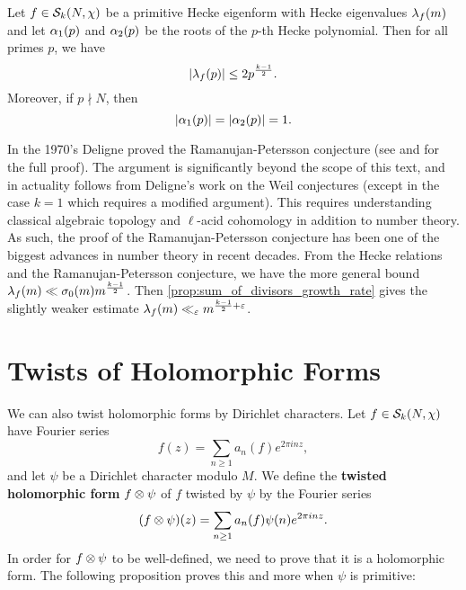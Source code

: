     \begin{theorem}
      Let $f \in \mathcal{S}_{k}(N,\chi)$ be a primitive Hecke eigenform with Hecke eigenvalues $\lambda_{f}(m)$ and let $\alpha_{1}(p)$ and $\alpha_{2}(p)$ be the roots of the $p$-th Hecke polynomial. Then for all primes $p$, we have
      \[
        |\lambda_{f}(p)| \le 2p^{\frac{k-1}{2}}.
      \]
      Moreover, if $p \nmid N$, then
      \[
        |\alpha_{1}(p)| = |\alpha_{2}(p)| = 1.
      \]
    \end{theorem}

    In the 1970's Deligne proved the Ramanujan-Petersson conjecture (see \cite{deligne1971formes} and \cite{deligne1974conjecture} for the full proof). The argument is significantly beyond the scope of this text, and in actuality follows from Deligne's work on the Weil conjectures (except in the case $k = 1$ which requires a modified argument). This requires understanding classical algebraic topology and $\ell$-acid cohomology in addition to number theory. As such, the proof of the Ramanujan-Petersson conjecture has been one of the biggest advances in number theory in recent decades. From the Hecke relations and the Ramanujan-Petersson conjecture, we have the more general bound $\lambda_{f}(m) \ll \sigma_{0}(m)m^{\frac{k-1}{2}}$. Then \cref{prop:sum_of_divisors_growth_rate} gives the slightly weaker estimate $\lambda_{f}(m) \ll_{\varepsilon} m^{\frac{k-1}{2}+\varepsilon}$.
  \section{Twists of Holomorphic Forms}
    We can also twist holomorphic forms by Dirichlet characters. Let $f \in \mathcal{S}_{k}(N,\chi)$ have Fourier series
    \[
      f(z) = \sum_{n \ge 1}a_{n}(f)e^{2\pi inz},
    \]
    and let $\psi$ be a Dirichlet character modulo $M$. We define the \textbf{twisted holomorphic form} $f \otimes \psi$ of $f$ twisted by $\psi$ by the Fourier series
    \[
      (f \otimes \psi)(z) = \sum_{n \ge 1}a_{n}(f)\psi(n)e^{2\pi inz}.
    \]
    In order for $f \otimes \psi$ to be well-defined, we need to prove that it is a holomorphic form. The following proposition proves this and more when $\psi$ is primitive:

